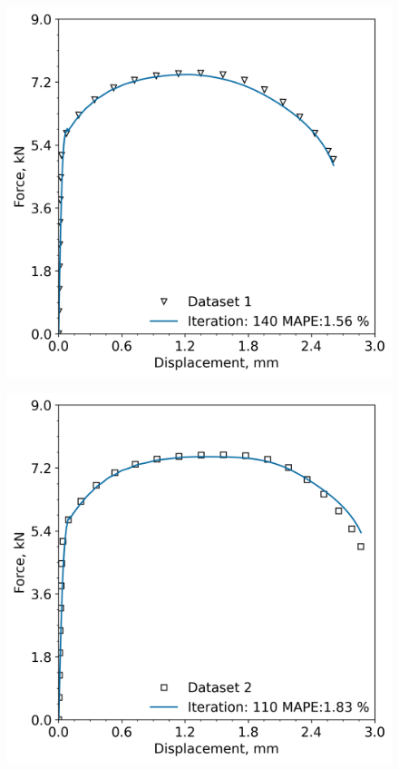 \documentclass[preprint, review, 12pt]{elsarticle}
\begin{document}
	\begin{figure}[!htbp]
		\begin{minipage}[b]{0.5\linewidth}
			\centering
			\includegraphics[width=\textwidth, height=0.45\textheight, keepaspectratio]{P91_20_2_FASTEST_ITERATION}
			\label{fig:dataset1}
		\end{minipage}
	\hspace{0.2cm}
		\begin{minipage}[b]{0.5\linewidth}
			\centering
			\includegraphics[width=\textwidth, height=0.45\textheight, keepaspectratio]{P91_20_1_FASTEST_ITERATION}

\end{minipage}
\end{figure}
\end{document}
